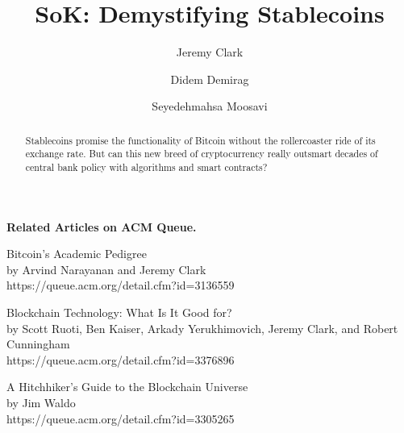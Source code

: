 \documentclass[acmlarge,screen]{acmart}
\begin{document}
\title{SoK: Demystifying Stablecoins}

\author{Jeremy Clark}

\author{Didem Demirag}

\author{Seyedehmahsa Moosavi}

\begin{abstract} Stablecoins promise the functionality of Bitcoin without the rollercoaster ride of its exchange rate. But can this new breed of cryptocurrency really outsmart decades of central bank policy with algorithms and smart contracts?\end{abstract}

\makeatletter
\let\@authorsaddresses\@empty
\makeatother

\maketitle












\clearpage
\begin{Sidebar*}[h!]
\begin{framed}
\begin{flushleft}
\textbf{Related Articles on ACM Queue.} \newline

Bitcoin’s Academic Pedigree \\
by Arvind Narayanan and Jeremy Clark \\
https://queue.acm.org/detail.cfm?id=3136559 \newline

Blockchain Technology: What Is It Good for? \\ 
by Scott Ruoti, Ben Kaiser, Arkady Yerukhimovich, Jeremy Clark, and Robert Cunningham \\
https://queue.acm.org/detail.cfm?id=3376896 \newline

A Hitchhiker’s Guide to the Blockchain Universe\\
by Jim Waldo \\
https://queue.acm.org/detail.cfm?id=3305265
\end{flushleft}
\end{framed}
\end{Sidebar*}
\end{document}
